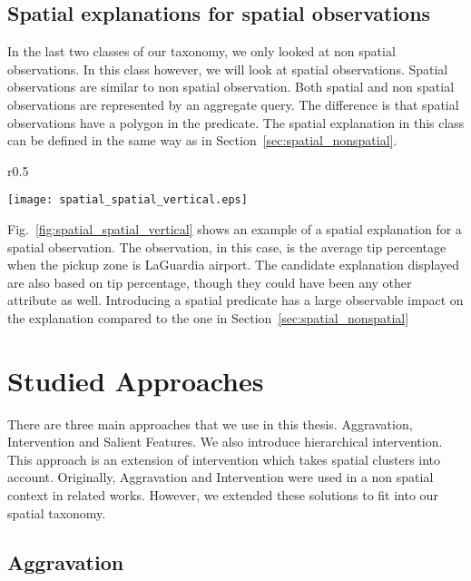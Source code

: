 \subsection{Spatial explanations for spatial observations}
\label{sec:spatial_spatial}
In the last two classes of our taxonomy, we only looked at non spatial observations. In this class however, we will look at spatial observations. Spatial observations are similar to non spatial observation. Both spatial and non spatial observations are represented by an aggregate query. The difference is that spatial observations have a polygon in the predicate. The spatial explanation in this class can be defined in the same way as in Section~\ref{sec:spatial_nonspatial}.

\begin{wrapfigure}{r}{0.5\textwidth}
  \begin{center}
    \texttt{[image: spatial\_spatial\_vertical.eps]}
  \end{center}
  \caption{An example of spatial explanation for a spatial observation}
\label{fig:spatial_spatial_vertical}
\end{wrapfigure}



Fig.~\ref{fig:spatial_spatial_vertical} shows an example of a spatial explanation for a spatial observation. The observation, in this case, is the average tip percentage when the pickup zone is LaGuardia airport. The candidate explanation displayed are also based on tip percentage, though they could have been any other attribute as well. Introducing a spatial predicate has a large observable impact on the explanation compared to the one in Section~\ref{sec:spatial_nonspatial}


\section{Studied Approaches}
\label{sec:approaches}
There are three main approaches that we use in this thesis. Aggravation, Intervention and Salient Features. We also introduce hierarchical intervention. This approach is an extension of intervention which takes spatial clusters into account. Originally, Aggravation and Intervention were used in a non spatial context in related works\citep{chirigati2016data}. However, we extended these solutions to fit into our spatial taxonomy.

\subsection{Aggravation}
\label{sec:aggravation}

